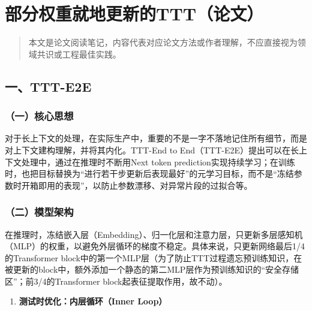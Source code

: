 \clearpage

\hypertarget{ux90e8ux5206ux6743ux91cdux5c31ux5730ux66f4ux65b0ux7684tttux8bbaux6587}{%
\section{部分权重就地更新的TTT（论文）}\label{ux90e8ux5206ux6743ux91cdux5c31ux5730ux66f4ux65b0ux7684tttux8bbaux6587}}

\begin{quote}
本文是论文阅读笔记，内容代表对应论文方法或作者理解，不应直接视为领域共识或工程最佳实践。
\end{quote}

\hypertarget{ux4e00ttt-e2e}{%
\subsection{一、TTT-E2E}\label{ux4e00ttt-e2e}}

\hypertarget{ux4e00ux6838ux5fc3ux601dux60f3-13}{%
\subsubsection{（一）核心思想}\label{ux4e00ux6838ux5fc3ux601dux60f3-13}}

对于长上下文的处理，在实际生产中，重要的不是一字不落地记住所有细节，而是对上下文建构理解，并将其内化。TTT-End to End（TTT-E2E）提出可以在长上下文处理中，通过在推理时不断用Next token prediction实现持续学习；在训练时，也把目标替换为``进行若干步更新后表现最好''的元学习目标，而不是``冻结参数时开箱即用的表现''，以防止参数漂移、对异常片段的过拟合等。

\hypertarget{ux4e8cux6a21ux578bux67b6ux6784-2}{%
\subsubsection{（二）模型架构}\label{ux4e8cux6a21ux578bux67b6ux6784-2}}

在推理时，冻结嵌入层（Embedding）、归一化层和注意力层，只更新多层感知机（MLP）的权重，以避免外层循环的梯度不稳定。具体来说，只更新网络最后1/4的Transformer block中的第一个MLP层（为了防止TTT过程遗忘预训练知识，在被更新的block中，额外添加一个静态的第二MLP层作为预训练知识的``安全存储区''；前3/4的Transformer block起表征提取作用，故不动）。

\begin{enumerate}
\def\labelenumi{\arabic{enumi}.}
\tightlist
\item
  \textbf{测试时优化：内层循环（Inner Loop）}
\end{enumerate}

